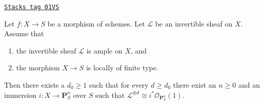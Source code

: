 \begin{lemma}
\label{morphisms-lemma-quasi-projective-finite-type-over-S}
\href{https://stacks.math.columbia.edu/tag/01VS}{\texttt{Stacks tag 01VS}}

Let $f : X \to S$ be a morphism of schemes.
Let $\mathcal{L}$ be an invertible sheaf on $X$.
Assume that
\begin{enumerate}
\item the invertible sheaf $\mathcal{L}$ is ample on $X$, and
\item the morphism $X \to S$ is locally of finite type.
\end{enumerate}
Then there exists a $d_0 \geq 1$ such that for every $d \geq d_0$
there exist an $n \geq 0$ and an immersion
$i : X \to \mathbf{P}^n_S$ over $S$ such that
$\mathcal{L}^{\otimes d} \cong i^*\mathcal{O}_{\mathbf{P}^n_S}(1)$.
\end{lemma}


